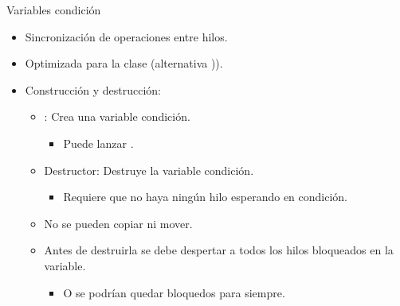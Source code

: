 \begin{frame}{Variables condición}
\begin{itemize}
  \item Sincronización de operaciones entre hilos.
  \item Optimizada para la clase  (alternativa )).
  \item Construcción y destrucción:
    \begin{itemize}
      \item {}: Crea una variable condición.
        \begin{itemize}
          \item Puede lanzar .
        \end{itemize}
      \item Destructor: Destruye la variable condición.
        \begin{itemize}
         \item Requiere que no haya ningún hilo esperando en condición.
        \end{itemize}
      \item No se pueden copiar ni mover.
      \item Antes de destruirla se debe despertar a todos los hilos bloqueados en la variable.
        \begin{itemize}
          \item O se podrían quedar bloquedos para siempre.
        \end{itemize}
    \end{itemize}
\end{itemize}
\end{frame}

